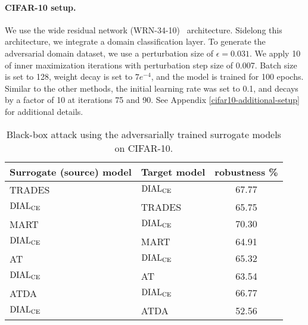 \paragraph{CIFAR-10 setup.} We use the wide residual network (WRN-34-10)~\citep{zagoruyko2016wide} architecture. %
Sidelong this architecture, we integrate a domain classification layer. To generate the adversarial domain dataset, we use a perturbation size of $\epsilon=0.031$. We apply 10 of inner maximization iterations with perturbation step size of 0.007. Batch size is set to 128, weight decay is set to $7e^{-4}$, and the model is trained for 100 epochs. Similar to the other methods, the initial learning rate was set to 0.1, and decays by a factor of 10 at iterations 75 and 90. 
See Appendix \ref{cifar10-additional-setup} for additional details.

\begin{table}[ht]
  \caption{Black-box attack using the adversarially trained surrogate models on CIFAR-10.}
  \vskip 0.1in
  \label{black-box-cifar-adv}
  \centering
  \small
  \begin{tabular}{ll|c}
    \toprule
    \cmidrule(r){1-2}
    Surrogate (source) model & Target model & robustness \% \\
    \midrule
    TRADES & $\operatorname{DIAL}_{\operatorname{CE}}$ & $\mathbf{67.77}$ \\
    $\operatorname{DIAL}_{\operatorname{CE}}$ & TRADES & 65.75 \\
    \midrule
    MART & $\operatorname{DIAL}_{\operatorname{CE}}$ & $\mathbf{70.30}$ \\
    $\operatorname{DIAL}_{\operatorname{CE}}$ & MART & 64.91 \\
    \midrule
    AT & $\operatorname{DIAL}_{\operatorname{CE}}$ & $\mathbf{65.32}$ \\
    $\operatorname{DIAL}_{\operatorname{CE}}$ & AT  & 63.54 \\
    \midrule
    ATDA & $\operatorname{DIAL}_{\operatorname{CE}}$ & $\mathbf{66.77}$ \\
    $\operatorname{DIAL}_{\operatorname{CE}}$ & ATDA & 52.56 \\
    \bottomrule
  \end{tabular}
\end{table}

